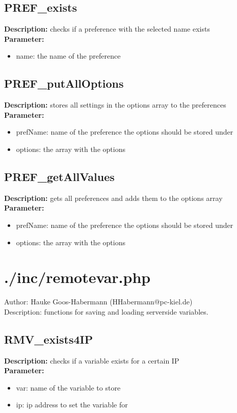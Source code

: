 \subsection{PREF\_exists}
\textbf{Description:} checks if a preference with the selected name exists\\
\textbf{Parameter:}
\begin{itemize}
\item name: the name of the preference
\end{itemize}

\subsection{PREF\_putAllOptions}
\textbf{Description:} stores all settings in the options array to the preferences\\
\textbf{Parameter:}
\begin{itemize}
\item prefName: name of the preference the options should be stored under
\item options: the array with the options
\end{itemize}

\subsection{PREF\_getAllValues}
\textbf{Description:} gets all preferences and adds them to the options array\\
\textbf{Parameter:}
\begin{itemize}
\item prefName: name of the preference the options should be stored under
\item options: the array with the options
\end{itemize}

\newpage\section{./inc/remotevar.php}
 Author: Hauke Goos-Habermann (HHabermann@pc-kiel.de)\\
 Description: functions for saving and loading serverside variables.\\

\subsection{RMV\_exists4IP}
\textbf{Description:} checks if a variable exists for a certain IP\\
\textbf{Parameter:}
\begin{itemize}
\item var: name of the variable to store
\item ip: ip address to set the variable for
\end{itemize}

